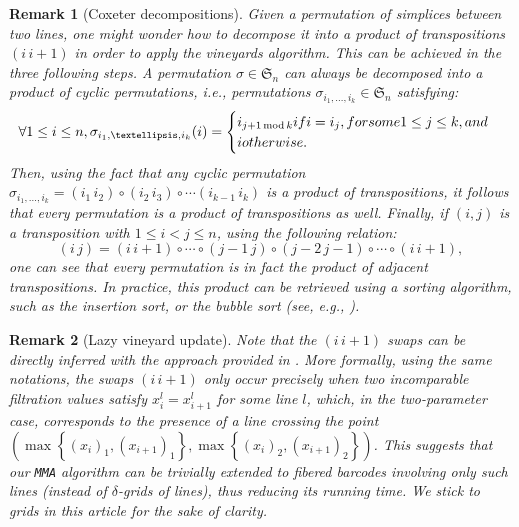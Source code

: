 \documentclass{article}
\newcommand{\MMA}{\texttt{MMA}}
\newtheorem{remark}{Remark}%
\begin{document}
\begin{remark}[Coxeter decompositions]
	Given a permutation of simplices between two lines, one might wonder how to
	decompose it into a product of transpositions $(i\, i+1)$ in order to apply the
	vineyards algorithm.
	This can be achieved in the three following steps.
	A permutation $\sigma\in
	\mathfrak S_n$ can always be decomposed into a product of cyclic
	permutations, i.e., permutations $\sigma_{i_1,\dots,i_k}\in \mathfrak S_n$
	satisfying:
	\begin{equation*}
		\forall 1\le i \le n, %
		\sigma_{i_1,\dots,i_k} (i) =
		\begin{cases}
			i_{j+1 \, \mathrm{mod}\, k} \textnormal{ if } i = i_j, \textnormal{ for some }1\leq j \leq k, \textnormal{ and } \\
			i \textnormal{ otherwise.}
		\end{cases}
	\end{equation*}
	Then, using the fact that any cyclic permutation
	$\sigma_{i_1,\dots,i_k} = (i_1\, i_{2})\circ (i_2\, i_3)\circ \cdots
	(i_{k-1}\, i_k)$ is a product of transpositions,
	it follows that every permutation is a product of transpositions as well.
	Finally, if $(i,j)$ is a transposition with $1\le i<j\le n$, using the following relation:
	\begin{equation*}
		(i\, j) = (i\, i+1)\circ \cdots \circ (j-1\, j) \circ (j-2\, j-1) \circ \cdots \circ(i \, i+1),
	\end{equation*}
	one can see that every permutation is in fact the product of adjacent transpositions.
	In practice, this product can be retrieved using a sorting algorithm, such as
	the insertion sort, or the bubble sort (see, e.g., \cite{knuthArtComputerProgramming1995}). \\
\end{remark}

\begin{remark}[Lazy vineyard update]
	Note that the $(i \, i+1)$ swaps can be directly inferred with
	the approach provided in
	\cite[Section 4, Lazy
	minimazation]{kerberFastMinimalPresentations2021}.
	More formally, using the same notations, the swaps $(i\, i+1)$ only occur
	precisely when two incomparable filtration values satisfy $x_i^l = x_{i+1}^l$
	for some line $l$,
	which, in the two-parameter case, corresponds to the presence of a line crossing the point
	$(\max \left\{ (x_i)_1,(x_{i+1})_1 \right\}, \max \left\{ (x_i)_2,(x_{i+1})_2
	\right\})$.
	This suggests that our \MMA{} algorithm can be trivially extended to fibered
	barcodes involving only such lines (instead of $\delta$-grids of lines), thus reducing its running time. We stick to grids in this article for the sake of clarity. \\
\end{remark}
\end{document}
